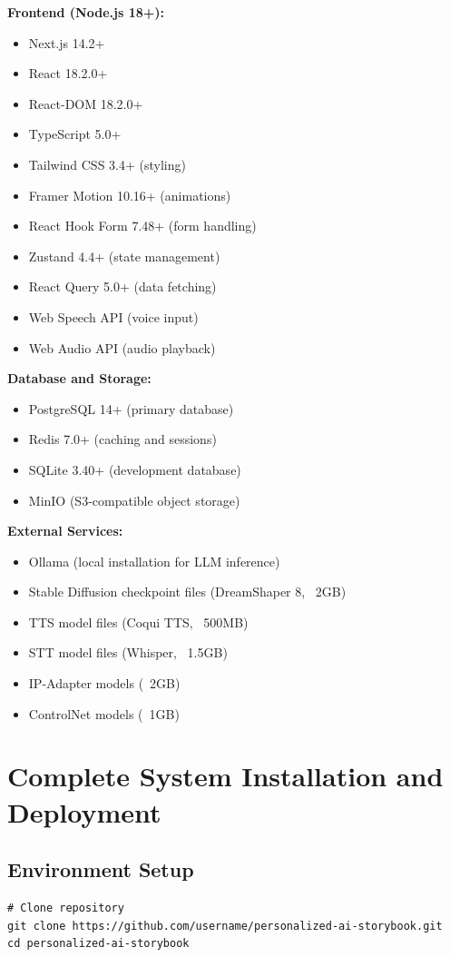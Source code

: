 {\textbf{Frontend (Node.js 18+):}
\begin{itemize}
    \item Next.js 14.2+
    \item React 18.2.0+
    \item React-DOM 18.2.0+
    \item TypeScript 5.0+
    \item Tailwind CSS 3.4+ (styling)
    \item Framer Motion 10.16+ (animations)
    \item React Hook Form 7.48+ (form handling)
    \item Zustand 4.4+ (state management)
    \item React Query 5.0+ (data fetching)
    \item Web Speech API (voice input)
    \item Web Audio API (audio playback)
\end{itemize}

\textbf{Database and Storage:}
\begin{itemize}
    \item PostgreSQL 14+ (primary database)
    \item Redis 7.0+ (caching and sessions)
    \item SQLite 3.40+ (development database)
    \item MinIO (S3-compatible object storage)
\end{itemize}

\textbf{External Services:}
\begin{itemize}
    \item Ollama (local installation for LLM inference)
    \item Stable Diffusion checkpoint files (DreamShaper 8, ~2GB)
    \item TTS model files (Coqui TTS, ~500MB)
    \item STT model files (Whisper, ~1.5GB)
    \item IP-Adapter models (~2GB)
    \item ControlNet models (~1GB)
\end{itemize}

\section{Complete System Installation and Deployment}

\subsection{Environment Setup}
\begin{verbatim}
# Clone repository
git clone https://github.com/username/personalized-ai-storybook.git
cd personalized-ai-storybook


\end{verbatim}}
